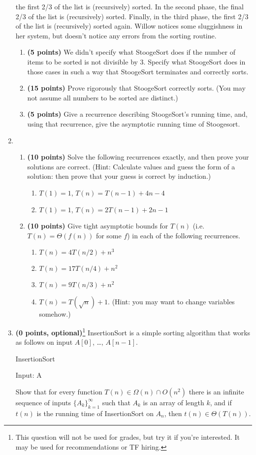 \documentclass[11pt]{article}
\begin{document}
\begin{enumerate}
the first 2/3 of the list is (recursively) sorted. In the second phase, the final 2/3 of the list is (recursively) sorted.
Finally, in the third phase, the first 2/3 of the list is (recursively) sorted again.
Willow notices some sluggishness in her system, but doesn't notice any errors from the sorting routine. 
\begin{enumerate} 
\item 
{\bf (5 points)}
We didn't specify what StoogeSort does if the number of items to be sorted is not divisible by 3. 
Specify what StoogeSort does in those cases in such a way that StoogeSort terminates and correctly sorts.
\item
{\bf (15 points)}
Prove rigorously that StoogeSort correctly sorts. 
(You may not assume all numbers to be sorted are distinct.) 
\item
{\bf (5 points)}
Give a recurrence describing StoogeSort's running time, 
and, using that recurrence, give the asymptotic running time of Stoogesort.
\end{enumerate}
\item
\begin{enumerate}
\item
{\bf (10 points)}
Solve the following recurrences exactly, and then prove your solutions are correct. (Hint:
Calculate values and guess the form of a solution: then prove that your guess is correct by induction.)
\begin{enumerate}
\item
$T(1) = 1$, $T(n) = T(n-1) +4n-4$
\item
$T(1) = 1$, $T(n) = 2T(n-1) +2n-1$
\end{enumerate}
\item
{\bf (10 points)}
Give tight asymptotic bounds for $T(n)$ (i.e. $T(n) = \Theta(f(n))$ for some $f$) in each of the following recurrences. 
\begin{enumerate}
\item
$T(n) = 4T(n/2) +n^3$
\item
$T(n) = 17T(n/4) +n^2$
\item
$T(n) = 9T(n/3) +n^2$
\item
$T(n) = T(\sqrt{n}) +1$. (Hint: you may want to change variables somehow.)
\end{enumerate}
\end{enumerate}
\item
{\bf (0 points, optional)}\footnote{This question will not be used for grades, but try it if you're interested. 
It may be used for recommendations or TF hiring.}
InsertionSort is a simple sorting algorithm that works as follows on input $A[0]$, \ldots, $A[n-1]$.
\begin{algorithm}
\caption{InsertionSort}
\begin{algorithmic}
\STATE Input: A
	\ENDWHILE
\ENDFOR
\end{algorithmic}
\end{algorithm}

Show that for every function $T(n) \in \Omega(n) \cap O(n^2)$
there is an infinite sequence of inputs $\{A_k\}_{k=1}^{\infty}$
such that $A_k$ is an array of length $k$, and if $t(n)$ is the running time of
InsertionSort on $A_n$, then $t(n) \in \Theta(T(n))$.
\end{enumerate}
\end{document}
